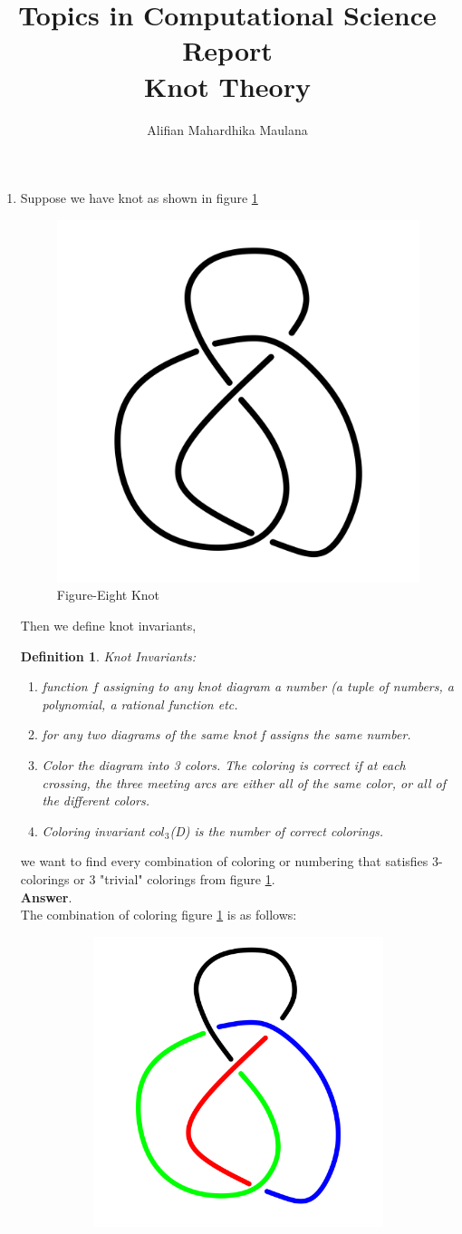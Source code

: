 \documentclass[a4paper,9pt]{article}
\title{Topics in Computational Science Report \\ Knot Theory}
\author{Alifian Mahardhika Maulana}
\newtheorem{defn}{Definition}[section]
\begin{document}
\maketitle
\begin{enumerate}
	\item Suppose we have knot as shown in figure \ref{fig:mainmodel}
	\begin{figure}[h!]
		\centering
		\includegraphics[width=0.4\linewidth]{picture/knotpict/knot-0}
		\caption{Figure-Eight Knot}
		\label{fig:mainmodel}
	\end{figure}
\newline
Then we define knot invariants,
\begin{defn} Knot Invariants:
	\begin{enumerate}
		\item function $f$ assigning to any knot diagram a number (a tuple of numbers, a polynomial, a rational function etc.
		\item for any two diagrams of the same knot f assigns the same number.
		\item Color the diagram into 3 colors. The coloring is correct if at each crossing,
		the three meeting arcs are either all of the same color, or all of the different
		colors.
		\item Coloring invariant $col_3$(D) is the number of correct colorings.
	\end{enumerate}
\end{defn}
we want to find every combination of coloring or numbering that satisfies 3-colorings or 3 "trivial" colorings from figure \ref{fig:mainmodel}.\\
\newpage
\textbf{Answer}.\\
The combination of coloring figure \ref{fig:mainmodel} is as follows:
\begin{figure}[h!]
	\begin{subfigure}[b]{0.25\linewidth}
		\centering
		\includegraphics[width=0.5\linewidth]{picture/knotpict/knot-1}

\end{subfigure}
\end{figure}
\end{enumerate}
\end{document}

